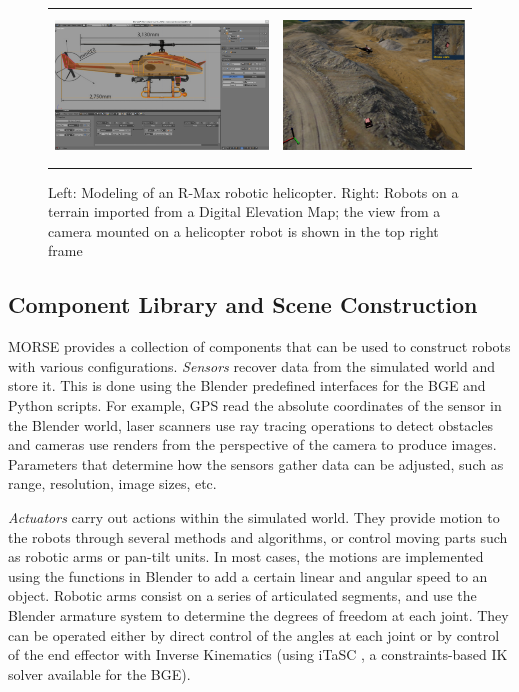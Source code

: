 \documentclass{llncs}
\begin{document}
\begin{figure}[ht!]
\centering
\begin{tabular}{cc}
 \includegraphics[height=1.55in]{pics/MORSE-rmax_mesh.png} &
 \includegraphics[height=1.55in]{pics/MORSE-quarry_ok-1.png}
\end{tabular}
\caption{Left: Modeling of an R-Max robotic helicopter. Right: Robots on a
    terrain imported from a Digital Elevation Map; the view from a camera mounted
    on a helicopter robot is shown in the top right frame}
\label{fig:models}
\end{figure}


\subsection{Component Library and Scene Construction}
\label{section:components}

MORSE provides a collection of components that can be used to construct robots
with various configurations.
\emph{Sensors} recover data from the simulated world and store it. This is
done using the Blender predefined interfaces for the BGE and Python scripts.
For example, GPS read the absolute coordinates of the sensor in the
Blender world, laser scanners use ray tracing operations to detect
obstacles and cameras use renders from the perspective of the camera to
produce images. Parameters that determine how the sensors gather data can
be adjusted, such as range, resolution, image sizes, etc.

\emph{Actuators} carry out actions within the simulated
world. They provide motion to the robots through several
methods and algorithms, or control moving parts such as robotic arms or
pan-tilt units. In most cases, the motions are implemented using the
functions in Blender to add a certain linear and angular speed to an
object.
Robotic arms consist on a series of articulated segments, and use the
Blender armature system to determine the degrees of freedom at each joint.
They can be operated either by direct control of the angles at each joint
or by control of the end effector with Inverse Kinematics (using iTaSC
\cite{iTaSC}, a constraints-based IK solver available for the BGE).
\end{document}
